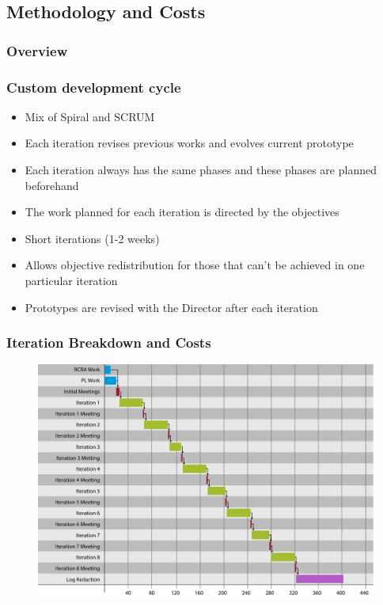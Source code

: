 \documentclass[english]{beamer}
\begin{document}
\subsection{Methodology and Costs}
\begin{frame}
	\frametitle{Overview}
\end{frame}
	\begin{frame}
		\frametitle{Custom development cycle}
			\begin{itemize}
			 \item Mix of Spiral and SCRUM
			 \item Each iteration revises previous works and \alert{evolves current prototype}
			 \item Each iteration always has the same phases and these phases are planned beforehand
			 \item The work planned for each iteration is \alert{directed by the objectives}
			 \item Short iterations (1-2 weeks)
			 \item Allows \alert{objective redistribution} for those that can't be achieved in one particular iteration
			 \item Prototypes are revised with the Director after each iteration
			\end{itemize}
	\end{frame}
	\begin{frame}
		\frametitle{Iteration Breakdown and Costs}
		\begin{figure}
		\centering
		\includegraphics[width=0.7\linewidth]{imagenes/diagrama_tareas.pdf}
		\end{figure}
		
				\begin{table}
				\centering
				\end{table}
	\end{frame}
\end{document}
